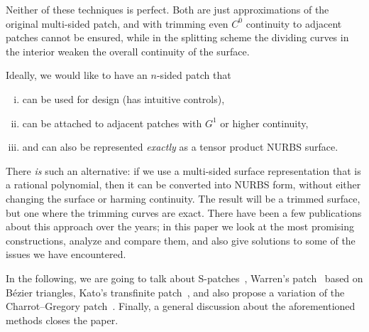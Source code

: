 \documentclass{article}
\begin{document}
Neither of these techniques is perfect. Both are just approximations of the original multi-sided
patch, and with trimming even $C^0$ continuity to adjacent patches cannot be ensured, while in the
splitting scheme the dividing curves in the interior weaken the overall continuity of the surface.

Ideally, we would like to have an $n$-sided patch that
\begin{enumerate}[i.]
\item can be used for design (has intuitive controls),
\item can be attached to adjacent patches with $G^1$ or higher continuity,
\item and can also be represented \emph{exactly} as a tensor product NURBS surface.
\end{enumerate}

There \emph{is} such an alternative:
if we use a multi-sided surface representation that is a rational polynomial,
then it can be converted into NURBS form, without either changing the surface or harming continuity.
The result will be a trimmed surface, but one where the trimming curves are exact.
There have been a few publications about this approach over the years;
in this paper we look at the most promising constructions, analyze and compare them,
and also give solutions to some of the issues we have encountered.

In the following, we are going to talk about
S-patches~\cite{spatch1},
Warren's patch~\cite{warren} based on B\'ezier triangles,
Kato's transfinite patch~\cite{kato},
and also propose a variation of the Charrot--Gregory patch~\cite{charrot}.
Finally, a general discussion about the aforementioned methods closes the paper.
\end{document}
